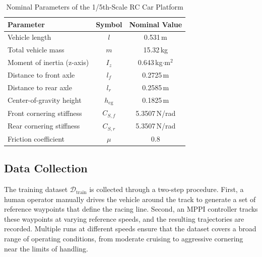\begin{table}[h]
\centering
\caption{Nominal Parameters of the 1/5th-Scale RC Car Platform}
\label{tab:params}
\begin{tabular}{lcc}
\toprule
\textbf{Parameter} & \textbf{Symbol} & \textbf{Nominal Value} \\
\midrule
Vehicle length & $l$ & 0.531\,m \\
Total vehicle mass & $m$ & 15.32\,kg \\
Moment of inertia (z-axis) & $I_z$ & 0.643\,kg$\cdot$m$^2$ \\
Distance to front axle & $l_f$ & 0.2725\,m \\
Distance to rear axle & $l_r$ & 0.2585\,m \\
Center-of-gravity height & $h_{\text{cg}}$ & 0.1825\,m \\
Front cornering stiffness & $C_{S,f}$ & 5.3507\,N/rad \\
Rear cornering stiffness & $C_{S,r}$ & 5.3507\,N/rad \\
Friction coefficient & $\mu$ & 0.8 \\
\bottomrule
\end{tabular}
\end{table}

\subsection{Data Collection}
\label{sec:datacollection}

The training dataset $\mathcal{D}_{\text{train}}$ is collected through a two-step procedure. First, a human operator manually drives the vehicle around the track to generate a set of reference waypoints that define the racing line. Second, an MPPI controller tracks these waypoints at varying reference speeds, and the resulting trajectories are recorded. Multiple runs at different speeds ensure that the dataset covers a broad range of operating conditions, from moderate cruising to aggressive cornering near the limits of handling.

